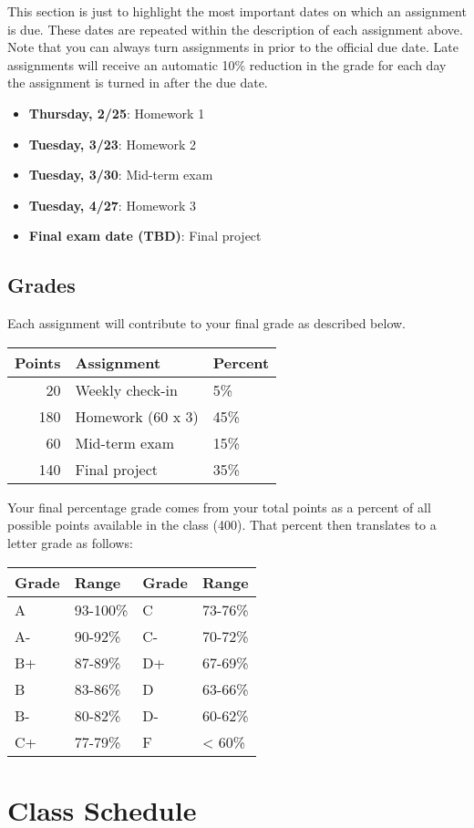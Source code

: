 \documentclass[11pt,]{article}
\providecommand{\tightlist}{%
  \setlength{\itemsep}{0pt}\setlength{\parskip}{0pt}}
\begin{document}
This section is just to highlight the most important dates on which an
assignment is due. These dates are repeated within the description of
each assignment above. Note that you can always turn assignments in
prior to the official due date. Late assignments will receive an
automatic 10\% reduction in the grade for each day the assignment is
turned in after the due date.

\begin{itemize}
\tightlist
\item
  \textbf{Thursday, 2/25}: Homework 1
\item
  \textbf{Tuesday, 3/23}: Homework 2
\item
  \textbf{Tuesday, 3/30}: Mid-term exam
\item
  \textbf{Tuesday, 4/27}: Homework 3
\item
  \textbf{Final exam date (TBD)}: Final project
\end{itemize}

\hypertarget{grades}{%
\subsection{Grades}\label{grades}}

Each assignment will contribute to your final grade as described below.

\begin{longtable}[]{@{}rll@{}}
\toprule
Points & Assignment & Percent\tabularnewline
\midrule
\endhead
20 & Weekly check-in & 5\%\tabularnewline
180 & Homework (60 x 3) & 45\%\tabularnewline
60 & Mid-term exam & 15\%\tabularnewline
140 & Final project & 35\%\tabularnewline
\bottomrule
\end{longtable}

Your final percentage grade comes from your total points as a percent of
all possible points available in the class (400). That percent then
translates to a letter grade as follows:

\begin{longtable}[]{@{}llll@{}}
\toprule
Grade & Range & Grade & Range\tabularnewline
\midrule
\endhead
A & 93-100\% & C & 73-76\%\tabularnewline
A- & 90-92\% & C- & 70-72\%\tabularnewline
B+ & 87-89\% & D+ & 67-69\%\tabularnewline
B & 83-86\% & D & 63-66\%\tabularnewline
B- & 80-82\% & D- & 60-62\%\tabularnewline
C+ & 77-79\% & F & \textless{} 60\%\tabularnewline
\bottomrule
\end{longtable}

\hypertarget{class-schedule}{%
\section{Class Schedule}\label{class-schedule}}
\end{document}
